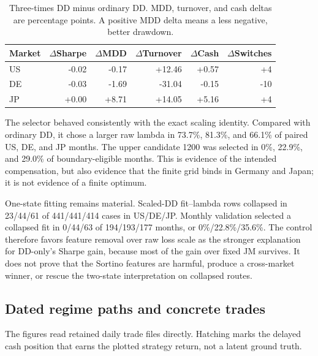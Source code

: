 \documentclass[11pt]{article}
\begin{document}
\begin{table}[!htbp]
\centering
\caption{Three-times DD minus ordinary DD. MDD, turnover, and cash deltas are
percentage points. A positive MDD delta means a less negative, better drawdown.}
\label{tab:scaled-delta}
\small
\begin{tabular}{lrrrrr}
\toprule
Market & \(\Delta\)Sharpe & \(\Delta\)MDD & \(\Delta\)Turnover & \(\Delta\)Cash & \(\Delta\)Switches \\
\midrule
US & -0.02 & -0.17 & +12.46 & +0.57 & +4 \\
DE & -0.03 & -1.69 & -31.04 & -0.15 & -10 \\
JP & +0.00 & +8.71 & +14.05 & +5.16 & +4 \\
\bottomrule
\end{tabular}
\end{table}

The selector behaved consistently with the exact scaling identity. Compared
with ordinary DD, it chose a larger raw lambda in 73.7\%, 81.3\%, and 66.1\%
of paired US, DE, and JP months. The upper candidate 1200 was selected in
0\%, 22.9\%, and 29.0\% of boundary-eligible months. This is evidence of the
intended compensation, but also evidence that the finite grid binds in Germany
and Japan; it is not evidence of a finite optimum.

One-state fitting remains material. Scaled-DD fit--lambda rows collapsed in
23/44/61 of 441/441/414 cases in US/DE/JP. Monthly validation selected a
collapsed fit in 0/44/63 of 194/193/177 months, or
0\%/22.8\%/35.6\%. The control therefore favors feature removal over raw loss
scale as the stronger explanation for DD-only's Sharpe gain, because most of
the gain over fixed JM survives. It does not prove that the Sortino features
are harmful, produce a cross-market winner, or rescue the two-state
interpretation on collapsed routes.

\subsection{Dated regime paths and concrete trades}

The figures read retained daily trade files directly. Hatching marks the
delayed cash position that earns the plotted strategy return, not a latent
ground truth.

\newcommand{\figroot}{../artifacts/reports/simple-jm-suite-2d3d2a779b13-0e026376c2cb-20260722T030918585813Z}
\end{document}
